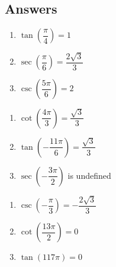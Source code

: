 \documentclass{ximera}
\begin{document}
\newpage

\subsection{Answers}

\begin{multicols}{3}

\begin{enumerate}

\item $\tan \left( \dfrac{\pi}{4} \right) = 1$ 
\item $\sec \left( \dfrac{\pi}{6} \right) = \dfrac{2\sqrt{3}}{3}$
\item $\csc \left( \dfrac{5\pi}{6} \right) = 2$ 

\setcounter{HW}{\value{enumi}}

\end{enumerate}

\end{multicols}

\begin{multicols}{3}

\begin{enumerate}

\setcounter{enumi}{\value{HW}}

\item $\cot \left( \dfrac{4\pi}{3} \right) = \dfrac{\sqrt{3}}{3}$
\item $\tan \left( -\dfrac{11\pi}{6} \right) = \dfrac{\sqrt{3}}{3}$
\item $\sec \left( -\dfrac{3\pi}{2} \right)$ is undefined 

\setcounter{HW}{\value{enumi}}

\end{enumerate}

\end{multicols}

\begin{multicols}{3}

\begin{enumerate}

\setcounter{enumi}{\value{HW}}

\item $\csc \left( -\dfrac{\pi}{3} \right) = -\dfrac{2\sqrt{3}}{3}$
\item $\cot \left( \dfrac{13\pi}{2} \right) = 0$
\item $\tan \left( 117\pi \right) = 0$ 

\setcounter{HW}{\value{enumi}}

\end{enumerate}

\end{multicols}
\end{document}

